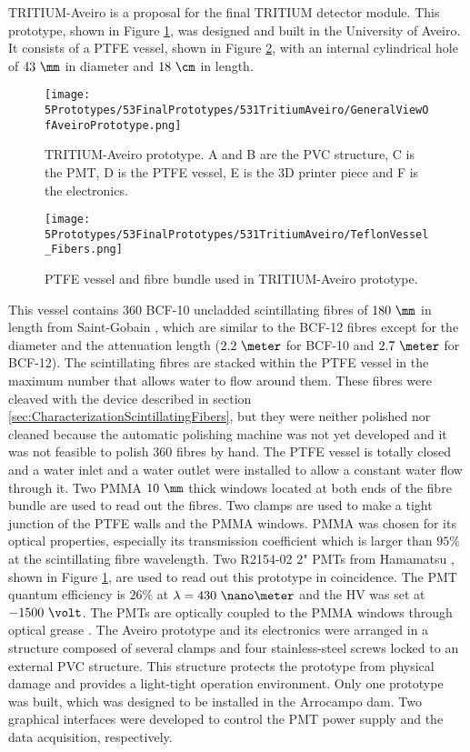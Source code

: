 TRITIUM-Aveiro is a proposal for the final TRITIUM detector module. This prototype, shown in Figure \ref{fig:TritiumAveiro0}, was designed and built in the University of Aveiro. It consists of a PTFE vessel, shown in Figure \ref{fig:TeflonStructureFibersTritiumAveiro0}, with an internal cylindrical hole of $43~\mm$ in diameter and $18~\cm$ in length.
\begin{figure}[h]
\centering
\texttt{[image: 5Prototypes/53FinalPrototypes/531TritiumAveiro/GeneralViewOfAveiroPrototype.png]}
\caption{TRITIUM-Aveiro prototype. A and B are the PVC structure, C is the PMT, D is the PTFE vessel, E is the 3D printer piece and F is the electronics.\label{fig:TritiumAveiro0}}
\end{figure}
\begin{figure}[h]
\centering
\texttt{[image: 5Prototypes/53FinalPrototypes/531TritiumAveiro/TeflonVessel\_Fibers.png]}
\caption{PTFE vessel and fibre bundle used in TRITIUM-Aveiro prototype.  \label{fig:TeflonStructureFibersTritiumAveiro0}}
\end{figure}
This vessel contains $360$ BCF-10 uncladded scintillating fibres of $180~\mm$ in length from Saint-Gobain \cite{DataSheetBCF12Fiber}, which are similar to the BCF-12 fibres except for the diameter and the attenuation length ($2.2~\meter$ for BCF-10 and $2.7~\meter$ for BCF-12). The scintillating fibres are stacked within the PTFE vessel in the maximum number that allows water to flow around them. These fibres were cleaved with the device described in section \ref{sec:CharacterizationScintillatingFibers}, but they were neither polished nor cleaned because the automatic polishing machine was not yet developed and it was not feasible to polish 360 fibres by hand. The PTFE vessel is totally closed and a water inlet and a water outlet were installed to allow a constant water flow through it. Two PMMA $10~\mm$ thick windows located at both ends of the fibre bundle are used to read out the fibres. Two clamps are used to make a tight junction of the PTFE walls and the PMMA windows. PMMA was chosen for its optical properties, especially its transmission coefficient which is larger than $95\%$ at the scintillating fibre wavelength. Two R2154-02 2" PMTs from Hamamatsu \cite{DataSheetPMTsAveiro}, shown in Figure \ref{fig:TritiumAveiro0}, are used to read out this prototype in coincidence. The PMT quantum efficiency is $26\%$ at $\lambda=430~\nano\meter$ and the HV was set at $-1500~\volt$. The PMTs are optically coupled to the PMMA windows through optical grease \cite{OpticalGrease}. The Aveiro prototype and its electronics were arranged in a structure composed of several clamps and four stainless-steel screws locked to an external PVC structure. This structure protects the prototype from physical damage and provides a light-tight operation environment. Only one prototype was built, which was designed to be installed in the Arrocampo dam. Two graphical interfaces were developed to control the PMT power supply and the data acquisition, respectively. 

